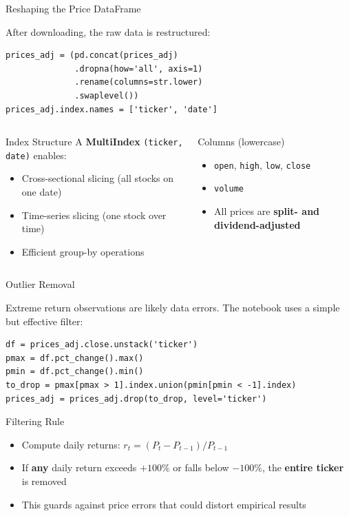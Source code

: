 \documentclass[aspectratio=169]{beamer}
\begin{document}
\begin{frame}[fragile]{Reshaping the Price DataFrame}

After downloading, the raw data is restructured:

\begin{lstlisting}
prices_adj = (pd.concat(prices_adj)
              .dropna(how='all', axis=1)
              .rename(columns=str.lower)
              .swaplevel())
prices_adj.index.names = ['ticker', 'date']
\end{lstlisting}
\small
\begin{columns}[T]
\begin{block}{Index Structure}
A \textbf{MultiIndex} \texttt{(ticker, date)} enables:
\begin{itemize}
  \item Cross-sectional slicing (all stocks on one date)
  \item Time-series slicing (one stock over time)
  \item Efficient group-by operations
\end{itemize}
\end{block}

\begin{block}{Columns (lowercase)}
\begin{itemize}
  \item \texttt{open}, \texttt{high}, \texttt{low}, \texttt{close}
  \item \texttt{volume}
  \item All prices are \textbf{split- and dividend-adjusted}
\end{itemize}
\end{block}
\end{columns}

\end{frame}
%
%
\begin{frame}[fragile]{Outlier Removal}

Extreme return observations are likely data errors. The notebook uses a simple but effective filter:

\begin{lstlisting}
df = prices_adj.close.unstack('ticker')
pmax = df.pct_change().max()
pmin = df.pct_change().min()
to_drop = pmax[pmax > 1].index.union(pmin[pmin < -1].index)
prices_adj = prices_adj.drop(to_drop, level='ticker')
\end{lstlisting}

\vspace{0.3cm}

\begin{block}{Filtering Rule}
\begin{itemize}
  \item Compute daily returns: $r_t = (P_t - P_{t-1})/P_{t-1}$
  \item If \textbf{any} daily return exceeds $+100\%$ or falls below $-100\%$, the \textbf{entire ticker} is removed
  \item This guards against price errors that could distort empirical results
\end{itemize}
\end{block}

\end{frame}
\end{document}
